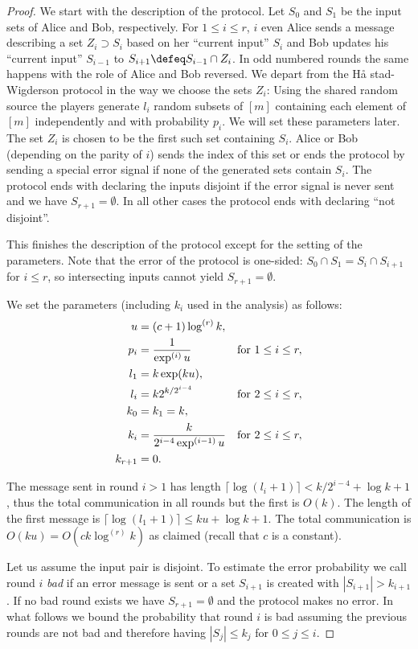 \begin{proof}
We start with the description of the protocol. Let $S_0$ and
$S_1$ be the input sets of Alice and Bob, respectively. For
$1\le i\le r$, $i$ even Alice sends a message describing a set
$Z_i\supset S_i$ based on her ``current input'' $S_i$ and Bob
updates his ``current input'' $S_{i-1}$ to $S_{i+1}\defeq
S_{i-1}\cap Z_i$. In odd numbered rounds the same happens with
the role of Alice and Bob reversed. We depart from the H\aa
stad-Wigderson protocol in the way we choose the sets $Z_i$:
Using the shared random source the players generate $l_i$ random
subsets of $[m]$ containing each element of $[m]$ independently
and with probability $p_i$. We will set these parameters later.
The set $Z_i$ is chosen to be the first such set containing
$S_i$. Alice or Bob (depending on the parity of $i$) sends the
index of this set or ends the protocol by sending a special
error signal if none of the generated sets contain $S_i$. The
protocol ends with declaring the inputs disjoint if the error
signal is never sent and we have $S_{r+1}=\emptyset$. In all
other cases the protocol ends with declaring ``not disjoint''.

This finishes the description of the protocol except for the
setting of the parameters. Note that the error of the protocol
is one-sided: $S_0\cap S_1=S_i\cap S_{i+1}$ for $i\le r$, so
intersecting inputs cannot yield $S_{r+1}=\emptyset$.

We set the parameters (including $k_i$ used in the analysis) 
as follows:
\begin{align*}
u&=(c+1)\log^{(r)}k,\\
p_i&=\frac1{\exp^{(i)}u}&\hbox{for }1\le i\le r,\\
l_1&=k\exp(ku),\\
l_i&=k2^{k/2^{i-4}}&\hbox{for }2\le i\le r,\\
k_0&=k_1=k,\\
k_i&=\frac k{2^{i-4}\exp^{(i-1)}u}&\hbox{for }2\le i\le r,\\
k_{r+1}&=0.
\end{align*}

The message sent in round $i>1$ has length
$\lceil\log(l_i+1)\rceil<k/2^{i-4}+\log k+1$, thus the total
communication in all rounds but the first is $O(k)$. The length
of the first message is $\lceil\log(l_1+1)\rceil\le ku+\log
k+1$. The total communication is $O(ku)=O(ck\log^{(r)}k)$ as
claimed (recall that $c$ is a constant).

Let us assume the input pair is disjoint. To estimate the error
probability we call round $i$ {\em bad} if an error message is
sent or a set $S_{i+1}$ is created with $|S_{i+1}|>k_{i+1}$. If
no bad round exists we have $S_{r+1}=\emptyset$ and the protocol
makes no error. In what follows we bound the probability that
round $i$ is bad assuming the previous rounds are not bad and
therefore having $|S_j|\le k_j$ for $0\le j\le i$.


\end{proof}
